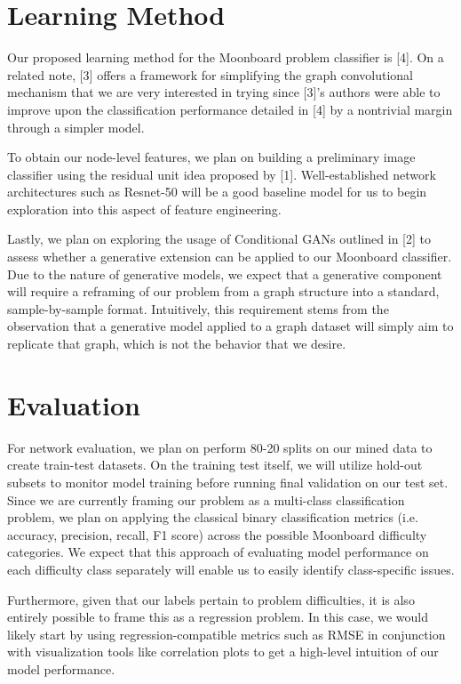 \documentclass{article}
\begin{document}
\section{Learning Method}
Our proposed learning method for the Moonboard problem classifier is [4]. On a related note, [3] offers a framework for simplifying the graph convolutional mechanism that we are very interested in trying since [3]'s authors were able to improve upon the classification performance detailed in [4] by a nontrivial margin through a simpler model. 

To obtain our node-level features, we plan on building a preliminary image classifier using the residual unit idea proposed by [1]. Well-established network architectures such as Resnet-50 will be a good baseline model for us to begin exploration into this aspect of feature engineering. 

Lastly, we plan on exploring the usage of Conditional GANs outlined in [2] to assess whether a generative extension can be applied to our Moonboard classifier. Due to the nature of generative models, we expect that a generative component will require a reframing of our problem from a graph structure into a standard, sample-by-sample format. Intuitively, this requirement stems from the observation that a generative model applied to a graph dataset will simply aim to replicate that graph, which is not the behavior that we desire. 

\section{Evaluation}
For network evaluation, we plan on perform 80-20 splits on our mined data to create train-test datasets. On the training test itself, we will utilize hold-out subsets to monitor model training before running final validation on our test set. Since we are currently framing our problem as a multi-class classification problem, we plan on applying the classical binary classification metrics (i.e. accuracy, precision, recall, F1 score) across the possible Moonboard difficulty categories. We expect that this approach of evaluating model performance on each difficulty class separately will enable us to easily identify class-specific issues.

Furthermore, given that our labels pertain to problem difficulties, it is also entirely possible to frame this as a regression problem. In this case, we would likely start by using regression-compatible metrics such as RMSE in conjunction with visualization tools like correlation plots to get a high-level intuition of our model performance. 
\end{document}
